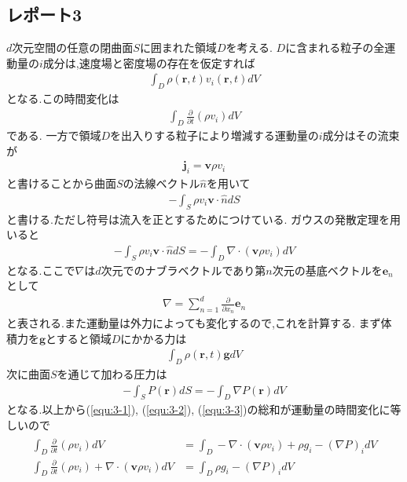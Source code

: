 \documentclass[uplatex,a4j,11pt,dvipdfmx]{jsarticle}
\begin{document}
\subsection*{レポート3}
$d$次元空間の任意の閉曲面$S$に囲まれた領域$D$を考える.
$D$に含まれる粒子の全運動量の$i$成分は,速度場と密度場の存在を仮定すれば
\begin{align}
  \int_D\rho({\bm r},t)v_i({\bm r},t)dV
\end{align}
となる.この時間変化は
\begin{align}
  \int_D\frac{\partial}{\partial t}(\rho v_i)dV
\end{align}
である.
一方で領域$D$を出入りする粒子により増減する運動量の$i$成分はその流束が
\begin{align}
  {\bm j}_i={\bm v}\rho v_i
\end{align}
と書けることから曲面$S$の法線ベクトル$\hat{n}$を用いて
\begin{align}
  -\int_S\rho v_i{\bm v}\cdot\hat{n}dS
\end{align}
と書ける.ただし符号は流入を正とするためにつけている.
ガウスの発散定理を用いると
\begin{align}
  \label{equ:3-1}
  -\int_S\rho v_i{\bm v}\cdot\hat{n}dS=-\int_D\nabla\cdot({\bm v}\rho v_i)dV
\end{align}
となる.ここで$\nabla$は$d$次元でのナブラベクトルであり第$n$次元の基底ベクトルを${\bm e}_n$として
\begin{align}
  \nabla=\sum_{n=1}^d\frac{\partial}{\partial x_n}{\bm e}_n
\end{align}
と表される.また運動量は外力によっても変化するので,これを計算する.
まず体積力を$\bm g$とすると領域$D$にかかる力は
\begin{align}
  \label{equ:3-2}
  \int_D\rho({\bm r},t){\bm g}dV
\end{align}
次に曲面$S$を通じて加わる圧力は
\begin{align}
  \label{equ:3-3}
  -\int_SP({\bm r})dS=-\int_D\nabla P({\bm r})dV
\end{align}
となる.以上から(\ref{equ:3-1}), (\ref{equ:3-2}), (\ref{equ:3-3})の総和が運動量の時間変化に等しいので
\begin{align}
  \begin{split}
    \int_D\frac{\partial}{\partial t}(\rho v_i)dV&=
    \int_D-\nabla\cdot({\bm v}\rho v_i)+\rho g_i-(\nabla P)_idV\\
    \int_D\frac{\partial}{\partial t}(\rho v_i)+\nabla\cdot({\bm v}\rho v_i)dV&=\int_D\rho g_i-(\nabla P)_idV
  \end{split}
\end{align}
\end{document}
